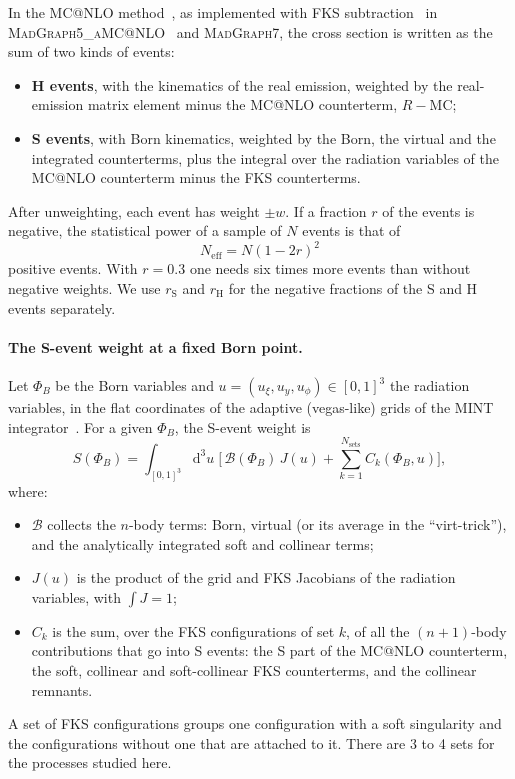 \documentclass[11pt,a4paper]{article}
\makeatletter
\newcommand{\mcatnlo}{\textsc{MC@NLO}}
\newcommand{\mg}{\textsc{MadGraph7}}
\newcommand{\rS}{r_{\mathrm S}}
\newcommand{\rH}{r_{\mathrm H}}
\newcommand{\Neff}{N_{\mathrm{eff}}}
\newcommand{\dd}{\mathrm{d}}
\makeatother
\begin{document}
In the \mcatnlo{} method~\cite{Frixione:2002ik}, as implemented with FKS
subtraction~\cite{Frixione:1995ms,Frederix:2009yq} in
\textsc{MadGraph5\_aMC@NLO}~\cite{Alwall:2014hca} and \mg, the cross section is written as
the sum of two kinds of events:
\begin{itemize}
\item \textbf{H events}, with the kinematics of the real emission, weighted by the real-emission
matrix element minus the \mcatnlo{} counterterm, $R-\mathrm{MC}$;
\item \textbf{S events}, with Born kinematics, weighted by the Born, the virtual and the
integrated counterterms, plus the integral over the radiation variables of the \mcatnlo{}
counterterm minus the FKS counterterms.
\end{itemize}
After unweighting, each event has weight $\pm w$. If a fraction $r$ of the events is negative,
the statistical power of a sample of $N$ events is that of
\begin{equation}
  \Neff = N(1-2r)^2
\end{equation}
positive events. With $r=0.3$ one needs six times more events than without negative weights.
We use $\rS$ and $\rH$ for the negative fractions of the S and H events separately.

\paragraph{The S-event weight at a fixed Born point.}
Let $\Phi_B$ be the Born variables and $u=(u_\xi,u_y,u_\phi)\in[0,1]^3$ the radiation
variables, in the flat coordinates of the adaptive (vegas-like) grids of the MINT
integrator~\cite{Nason:2007vt}. For a given $\Phi_B$, the S-event weight is
\begin{equation}
  S(\Phi_B) = \int_{[0,1]^3}\dd^3u\;\Big[\,\mathcal B(\Phi_B)\,J(u)
                               + \sum_{k=1}^{N_{\mathrm{sets}}} C_k(\Phi_B,u)\Big] ,
  \label{eq:S}
\end{equation}
where:
\begin{itemize}
\item $\mathcal B$ collects the $n$-body terms: Born, virtual (or its average in the
``virt-trick''), and the analytically integrated soft and collinear terms;
\item $J(u)$ is the product of the grid and FKS Jacobians of the radiation variables, with
$\int J=1$;
\item $C_k$ is the sum, over the FKS configurations of set $k$, of all the $(n{+}1)$-body
contributions that go into S events: the S part of the \mcatnlo{} counterterm, the soft,
collinear and soft-collinear FKS counterterms, and the collinear remnants.
\end{itemize}
A set of FKS configurations groups one configuration with a soft singularity and the
configurations without one that are attached to it. There are 3 to 4 sets for the processes
studied here.
\end{document}
